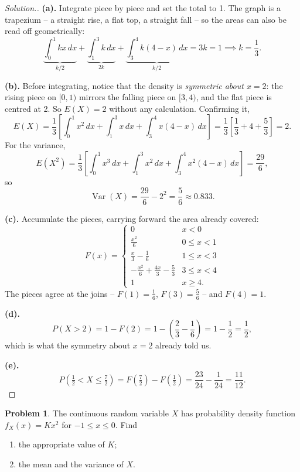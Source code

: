 \documentclass[12pt,a4paper]{report}
\theoremstyle{definition}
\theoremstyle{plain}
\theoremstyle{definition}
\newtheorem{problemx}{Problem}[section]
\newenvironment{problem}{\begin{problemx}}{\end{problemx}}
\newenvironment{solution}
  {\renewcommand{\qedsymbol}{}\begin{proof}[\textit{Solution}.]}
  {\end{proof}}
\begin{document}
\begin{solution}
\textbf{(a).} Integrate piece by piece and set the total to 1. The graph is a trapezium
-- a straight rise, a flat top, a straight fall -- so the areas can also be read off
geometrically:
\[\underbrace{\int_0^1 kx\,dx}_{k/2} + \underbrace{\int_1^3 k\,dx}_{2k}
 + \underbrace{\int_3^4 k(4-x)\,dx}_{k/2} = 3k = 1 \implies k = \frac{1}{3}.\]

\textbf{(b).} Before integrating, notice that the density is \emph{symmetric about
$x=2$}: the rising piece on $[0,1)$ mirrors the falling piece on $[3,4)$, and the flat
piece is centred at 2. So $E(X) = 2$ without any calculation. Confirming it,
\[E(X) = \frac13\left[\int_0^1 x^2\,dx + \int_1^3 x\,dx + \int_3^4 x(4-x)\,dx\right]
 = \frac13\left[\frac13+4+\frac{5}{3}\right] = 2.\]
For the variance,
\[E(X^2) = \frac13\left[\int_0^1 x^3\,dx + \int_1^3 x^2\,dx + \int_3^4 x^2(4-x)\,dx\right]
 = \frac{29}{6},\]
so
\[\operatorname{Var}(X) = \frac{29}{6}-2^2 = \frac{5}{6} \approx 0.833.\]

\textbf{(c).} Accumulate the pieces, carrying forward the area already covered:
\[F(x) = \begin{cases}
0 & x<0\\[2pt]
\frac{x^2}{6} & 0\leq x<1\\[6pt]
\frac{x}{3}-\frac{1}{6} & 1\leq x<3\\[6pt]
-\frac{x^2}{6}+\frac{4x}{3}-\frac{5}{3} & 3\leq x<4\\[6pt]
1 & x\geq 4.
\end{cases}\]
The pieces agree at the joins -- $F(1)=\tfrac16$, $F(3)=\tfrac56$ -- and $F(4)=1$.

\textbf{(d).} \[P(X>2) = 1-F(2) = 1-\left(\frac23-\frac16\right) = 1-\frac12 = \frac12,\]
which is what the symmetry about $x=2$ already told us.

\textbf{(e).} \[P\left(\tfrac12<X\leq\tfrac72\right) = F\left(\tfrac72\right)-F\left(\tfrac12\right)
 = \frac{23}{24}-\frac{1}{24} = \frac{11}{12}.\]
\end{solution}

\begin{problem}
The continuous random variable $X$ has probability density function $f_X(x) = Kx^{2}$ for
$-1\leq x\leq 0$. Find
\begin{enumerate}
\item[(a).] the appropriate value of $K$;
\item[(b).] the mean and the variance of $X$.
\end{enumerate}
\end{problem}
\end{document}
